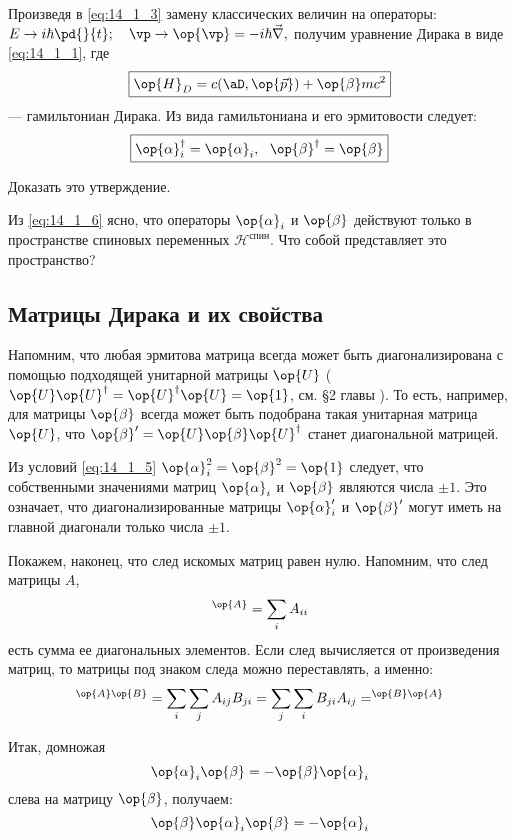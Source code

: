 Произведя в \eqref{eq:14_1_3} замену классических величин на операторы:
${E \to i\hbar \pd{}{t};~~~\vp \to \op{\vp} = -i \hbar \vec{\nabla},}$
получим уравнение Дирака в виде \eqref{eq:14_1_1}, где
\begin{equation}
\label{eq:14_1_6}
\boxed{\op{H}_D = c(\aD, \op{\vec{p}}) + \op{\beta} mc^2}
\end{equation}
--- гамильтониан Дирака. Из вида гамильтониана и его эрмитовости следует:
$$
\boxed{\op{\alpha}_i^\dag = \op{\alpha}_i,~~\op{\beta}^\dag = \op{\beta}}
$$

\begin{excr}
Доказать это утверждение.
\end{excr}

Из \eqref{eq:14_1_6} ясно, что операторы $\op{\alpha}_i$ и $\op{\beta}$ действуют только в пространстве спиновых переменных $\mathcal{H}^{\text{спин}}$. Что собой представляет это пространство?

\subsection{Матрицы Дирака и их свойства}

Напомним, что любая эрмитова матрица всегда может быть диагонализирована с помощью подходящей унитарной матрицы $\op{U}$ ($\op{U} \op{U}^\dag = \op{U}^\dag \op{U} = \op{1}$, см. \S 2 главы ). То есть, например, для матрицы $\op{\beta}$ всегда может быть подобрана такая унитарная матрица $\op{U}$, что $\op{\beta}' = \op{U} \op{\beta} \op{U}^\dag$ станет диагональной матрицей.

Из условий \eqref{eq:14_1_5} $\op{\alpha}_i^2 = \op{\beta}^2 = \op{1}$ следует, что собственными значениями матриц $\op{\alpha}_i$ и $\op{\beta}$ являются числа $\pm 1$. Это означает, что диагонализированные матрицы $\op{\alpha}_i'$ и $\op{\beta}'$ могут иметь на главной диагонали только числа $\pm 1$.

Покажем, наконец, что след искомых матриц равен нулю. Напомним, что след матрицы $A$,
$$
\sp \op{A} = \sum_i A_{ii}
$$
есть сумма ее диагональных элементов. Если след вычисляется от произведения матриц, то матрицы под знаком следа можно переставлять, а именно:
$$
\sp{\op{A}\op{B}} = \sum_i \sum_j A_{ij} B_{ji} = \sum_j \sum_i B_{ji} A_{ij} = \sp{\op{B} \op{A}}
$$

Итак, домножая
$$
\op{\alpha}_i \op{\beta} = - \op{\beta} \op{\alpha}_i
$$
слева на матрицу $\op{\beta}$, получаем:
$$
\op{\beta}\op{\alpha}_i \op{\beta} = -\op{\alpha}_i
$$

